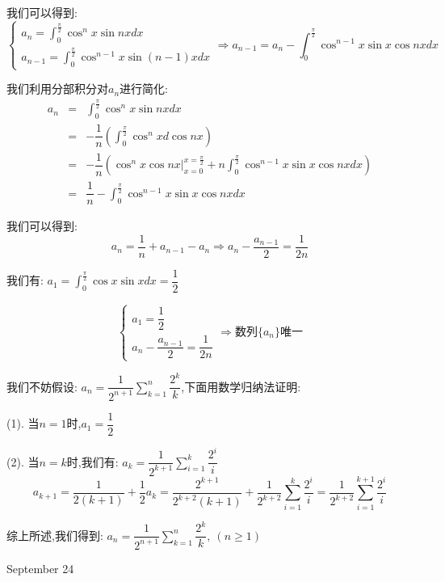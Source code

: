 \begin{solution}

	我们可以得到:
	$$\left\lbrace
	\begin{array}{l}
		a_{n}=\int_{0}^{\frac{\pi}{2}}\cos^n x\sin nxdx\\
		a_{n-1}=\int_{0}^{\frac{\pi}{2}}\cos^{n-1} x\sin(n-1)xdx
	\end{array}
	\right. \Rightarrow a_{n-1}=a_{n}-\int_{0}^{\frac{\pi}{2}}\cos^{n-1}x\sin x\cos nxdx$$
	
	我们利用分部积分对$a_{n}$进行简化:  
	\begin{eqnarray*}
		a_{n}&=&\int_{0}^{\frac{\pi}{2}}\cos^n x\sin nxdx\\
		&=&-\dfrac{1}{n}\left(\int_{0}^{\frac{\pi}{2}}\cos^n xd\cos nx \right)\\
		&=&-\dfrac{1}{n}\left(\cos^n x\cos nx|_{x=0}^{x=\frac{\pi}{2}}+n\int_{0}^{\frac{\pi}{2}}\cos^{n-1}x\sin x\cos nxdx\right)\\
		&=&\dfrac{1}{n}-\int_{0}^{\frac{\pi}{2}}\cos^{n-1}x\sin x\cos nxdx
	\end{eqnarray*}

	我们可以得到:  $$a_{n}=\dfrac{1}{n}+a_{n-1}-a_{n}\Rightarrow a_{n}-\dfrac{a_{n-1}}{2}=\dfrac{1}{2n}$$
	
	我们有:  $a_{1}=\int_{0}^{\frac{\pi}{2}}\cos x\sin xdx=\dfrac{1}{2}$
	
	$$\left\lbrace
	\begin{array}{l}
		a_{1}=\dfrac{1}{2}\\
		a_{n}-\dfrac{a_{n-1}}{2}=\dfrac{1}{2n}
	\end{array}
	\right. \Rightarrow\text{数列}\{a_{n}\}\text{唯一}$$
	
	我们不妨假设:  $a_{n}=\dfrac{1}{2^{n+1}}\sum\limits_{k=1}^{n}\dfrac{2^k}{k}$,下面用数学归纳法证明:  
	
	(1). 当$n=1$时,$a_{1}=\dfrac{1}{2}$
	
	(2). 当$n=k$时,我们有:  $a_{k}=\dfrac{1}{2^{k+1}}\sum\limits_{i=1}^{k}\dfrac{2^i}{i}$
	$$a_{k+1}=\dfrac{1}{2(k+1)}+\dfrac{1}{2}a_{k}=\dfrac{2^{k+1}}{2^{k+2}(k+1)}+\dfrac{1}{2^{k+2}}\sum\limits_{i=1}^{k}\dfrac{2^i}{i}=\dfrac{1}{2^{k+2}}\sum\limits_{i=1}^{k+1}\dfrac{2^i}{i}$$
	
	综上所述,我们得到:  $a_{n}=\dfrac{1}{2^{n+1}}\sum\limits_{k=1}^{n}\dfrac{2^k}{k},\ (n\geq 1)$
\end{solution}


\textcolor{purplea}{September 24}

